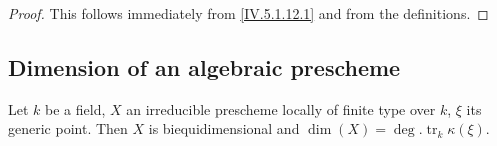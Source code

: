 \begin{proof}
This follows immediately from \eqref{IV.5.1.12.1} and from the definitions.
\end{proof}

\subsection{Dimension of an algebraic prescheme}
\label{subsection:IV.5.2}


\begin{proposition}[5.2.1]
\label{IV.5.2.1}
Let $k$ be a field, $X$ an irreducible prescheme locally of finite type over $k$, $\xi$ its generic point.
Then $X$ is biequidimensional and $\dim(X)=\deg.\operatorname{tr}_k\kappa(\xi)$.
\end{proposition}

